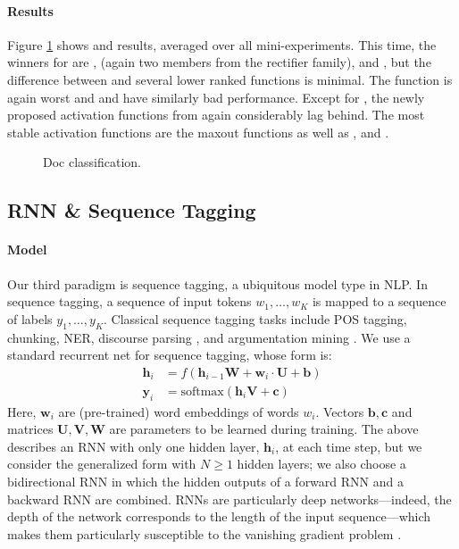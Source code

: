\paragraph{Results}
Figure \ref{fig:doc} shows \best{} and \avg{} results, averaged over all mini-experiments. This time, the winners for \best{} are \elu{}, \selu{} (again two members from the rectifier family), and \maxoutb{}, but the difference between \maxoutb{} and several lower ranked functions is minimal. The \cube{} function is again worst and \sigmoid{} and \cosid{} have similarly bad performance. Except for \minsin{}, the newly proposed activation functions from \citet{Ramach:2018} again considerably lag behind. The most stable activation functions are the maxout functions as well as \pentan{}, \mytanh{} and \mysin{}.  

\begin{figure}[!htb]
\centering
\scalebox{0.5}{}
\caption{Doc classification.}
\label{fig:doc}
\end{figure}

\subsection{RNN \& Sequence Tagging}\label{sec:3}
\paragraph{Model} Our third paradigm is sequence tagging, a ubiquitous model type in NLP. In sequence tagging, a sequence of input tokens $w_1,\ldots,w_K$ is mapped to a sequence of labels $y_1,\ldots,y_K$. Classical sequence tagging tasks include POS tagging, chunking, NER, discourse parsing \cite{Braud:2017}, and argumentation mining \cite{Eger:2017,Schulz:2018}. We use a standard recurrent net for sequence tagging, whose form is:
\begin{align*}
  \mathbf{h}_i &= f(\mathbf{h}_{i-1}\mathbf{W}+\mathbf{w}_i\cdot\mathbf{U}+\mathbf{b})\\
  \mathbf{y}_i &= \text{softmax}(\mathbf{h}_i\mathbf{V}+\mathbf{c})
\end{align*}
Here, $\mathbf{w}_i$ are (pre-trained) word embeddings of words $w_i$. Vectors $\mathbf{b},\mathbf{c}$ and matrices $\mathbf{U},\mathbf{V},\mathbf{W}$ are parameters to be learned during training. The above describes an RNN with only one hidden layer, $\mathbf{h}_i$, at each time step, but we consider the generalized form with $N\ge 1$ hidden layers; we also choose a bidirectional RNN in which the hidden outputs of a forward RNN and a backward RNN are combined. 
RNNs are particularly deep networks---indeed, the depth of the network corresponds to the length of the input sequence---which makes them particularly susceptible to the vanishing gradient problem \cite{Pascanu:2013}. 

